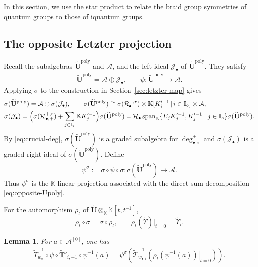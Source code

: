 \documentclass[a4paper,reqno,12pt]{amsart}
\numberwithin{equation}{section}
\newtheorem{lemma}[proposition]{Lemma}
\theoremstyle{definition}
\theoremstyle{plain}
\theoremstyle{definition}
\def\K{\mathbb K}
\def\I{\mathbb I}
\def\wI{\I_\circ}
\def\bw{w_\bullet}
\def\bwi{w_{\bullet,i}}
\def\tU{\widetilde{\mathbf U}}
\def\tTD{\widetilde T}
\def\tT{\widetilde{\mathscr T}}
\def\tTT{\widetilde{\mathbf T}}
\def\tfX{\widetilde\Upsilon}
\def\cA{\mathcal A}
\def\cR{\mathcal R}
\def\cH{\mathcal H}
\def\cJ{\mathcal J}
\newcommand{\tTa}[1]{\tTT'_{#1,-1}}
\newcommand{\Span}{\operatorname{span}}
\newcommand{\poly}{\mathrm{poly}}
\begin{document}
In this section, we use the star product to relate the braid group symmetries of quantum groups to those of iquantum groups. 

\subsection{The opposite Letzter projection}
Recall the subalgebras $\tU^\poly$ and $\cA$, and the left ideal $\cJ_\bullet$ of $\tU^\poly$. They satisfy 
\begin{align*}
 \tU^\poly=\cA\oplus\cJ_\bullet,\qquad
\psi:\tU^\poly\longrightarrow\cA.   
\end{align*}
Applying $\sigma$ to the construction in Section~\ref{sec:letzter map} gives
\begin{align}
&\sigma(\tU^\poly)=\cA\oplus\sigma(\cJ_\bullet),\qquad\sigma(\tU^\poly)\cong\sigma(\cR_{\bullet}^{+,r})\otimes \K[K_i'^{-1}\,|\,i\in \I_\circ]\otimes \cA,\label{eq:opposite-Upoly}\\
&\sigma(\cJ_\bullet)=\Bigl(\sigma(\cR_{\bullet,+}^{+,r})
+\sum_{j\in\wI}\K K_j'^{-1}\Bigr)\sigma(\tU^\poly)= \cH_\bullet\Span_\K\{E_jK_j'^{-1},K_j'^{-1}\mid j\in\wI\}\sigma(\tU^\poly).\label{eq:right idea}
\end{align}
By \eqref{eq:crucial-deg}, $\sigma(\tU^\poly)$ is a graded subalgebra for $\deg_{\bullet,i}^+$ and $\sigma(\cJ_\bullet)$ is a graded right ideal of $\sigma(\tU^\poly)$.
Define
\begin{equation}
\psi^\sigma:=\sigma\circ\psi\circ\sigma:\sigma(\tU^\poly)\rightarrow\cA.\label{eq:opposite-projection}
\end{equation}
Thus $\psi^\sigma$ is the $\K$-linear projection associated with the direct-sum decomposition \eqref{eq:opposite-Upoly}.

For the automorphism $\rho_t$ of $\tU\otimes_\K\K[t,t^{-1}]$,
\begin{equation}\label{eq:sigma and specialization}
  \rho_t\circ\sigma=\sigma\circ\rho_t,\qquad  \rho_t(\tfX)\big|_{t=0}=\tfX_i. 
\end{equation}

\begin{lemma}\label{lem:opposite-braid}
For $a\in\cA^{[0]}$, one has
\begin{align}
\tTD_{\bw}^{-1}\circ\psi\circ\tTa{i}\circ\psi^{-1}(a)
=\psi^\sigma\left(
\tT_{\bwi}^{-1}\left(
\left.\rho_t(\psi^{-1}(a))\right|_{t=0}\right)\right).
\label{eq:opposite-braid}
\end{align}
\end{lemma}
\end{document}
